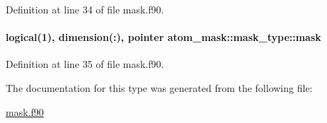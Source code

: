 Definition at line 34 of file mask.\-f90.

\hypertarget{structatom__mask_1_1mask__type_a9b592dd0db7db095d29e22fe4a808fad}{
\paragraph[{mask}]{\setlength{\rightskip}{0pt plus 5cm}logical(1), dimension(\-:), pointer atom\-\_\-mask\-::mask\-\_\-type\-::mask}}\label{structatom__mask_1_1mask__type_a9b592dd0db7db095d29e22fe4a808fad}


Definition at line 35 of file mask.\-f90.



The documentation for this type was generated from the following file\-:\begin{DoxyCompactItemize}
\item 
\hyperlink{mask_8f90}{mask.\-f90}\end{DoxyCompactItemize}
